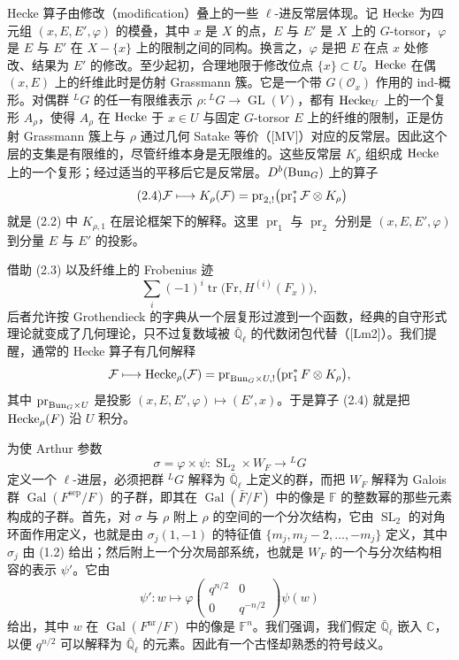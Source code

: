 Hecke 算子由修改（modification）叠上的一些 $\ell$-进反常层体现。记 $\mathrm{Hecke}$ 为四元组 $(x,E,E',\varphi)$ 的模叠，其中 $x$ 是 $X$ 的点，$E$ 与 $E'$ 是 $X$ 上的 $G$-torsor，$\varphi$ 是 $E$ 与 $E'$ 在 $X-\{x\}$ 上的限制之间的同构。换言之，$\varphi$ 是把 $E$ 在点 $x$ 处修改、结果为 $E'$ 的修改。至少起初，合理地限于修改位点 $\{x\}\subset U$。$\mathrm{Hecke}$ 在偶 $(x,E)$ 上的纤维此时是仿射 Grassmann 簇。它是一个带 $G(\mathcal O_x)$ 作用的 ind-概形。对偶群 ${}^LG$ 的任一有限维表示 $\rho:{}^LG\to\operatorname{GL}(V)$，都有 $\mathrm{Hecke}_U$ 上的一个复形 $A_\rho$，使得 $A_\rho$ 在 $\mathrm{Hecke}$ 于 $x\in U$ 与固定 $G$-torsor $E$ 上的纤维的限制，正是仿射 Grassmann 簇上与 $\rho$ 通过几何 Satake 等价（[MV]）对应的反常层。因此这个层的支集是有限维的，尽管纤维本身是无限维的。这些反常层 $K_\rho$ 组织成 $\mathrm{Hecke}$ 上的一个复形；经过适当的平移后它是反常层。$D^b(\mathrm{Bun}_G)$ 上的算子
\begin{equation}\tag{2.4}
\mathcal F\longmapsto K_\rho(\mathcal F)=\operatorname{pr}_{2,!}\bigl(\operatorname{pr}_1^*\mathcal F\otimes K_\rho\bigr)
\end{equation}
就是 (2.2) 中 $K_{\rho,1}$ 在层论框架下的解释。这里 $\operatorname{pr}_1$ 与 $\operatorname{pr}_2$ 分别是 $(x,E,E',\varphi)$ 到分量 $E$ 与 $E'$ 的投影。

借助 (2.3) 以及纤维上的 Frobenius 迹
\[
\sum_i(-1)^i\operatorname{tr}\bigl(\mathrm{Fr},H^{(i)}(F_x)\bigr),
\]
后者允许按 Grothendieck 的字典从一个层复形过渡到一个函数，经典的自守形式理论就变成了几何理论，只不过复数域被 $\bar{\mathbb Q}_\ell$ 的代数闭包代替（[Lm2]）。我们提醒，通常的 Hecke 算子有几何解释
\[
\mathcal F\longmapsto\mathrm{Hecke}_\rho(\mathcal F)
=\operatorname{pr}_{\mathrm{Bun}_G\times U,!}\bigl(\operatorname{pr}_1^*F\otimes K_\rho\bigr),
\]
其中 $\operatorname{pr}_{\mathrm{Bun}_G\times U}$ 是投影 $(x,E,E',\varphi)\mapsto(E',x)$。于是算子 (2.4) 就是把 $\mathrm{Hecke}_\rho(F)$ 沿 $U$ 积分。

为使 Arthur 参数
\begin{equation}\tag{2.5}
\sigma=\varphi\times\psi:\operatorname{SL}_2\times W_F\longrightarrow{}^LG
\end{equation}
定义一个 $\ell$-进层，必须把群 ${}^LG$ 解释为 $\bar{\mathbb Q}_\ell$ 上定义的群，而把 $W_F$ 解释为 Galois 群 $\operatorname{Gal}(F^{\mathrm{sep}}/F)$ 的子群，即其在 $\operatorname{Gal}(\bar F/F)$ 中的像是 $\mathbb F$ 的整数幂的那些元素构成的子群。首先，对 $\sigma$ 与 $\rho$ 附上 $\rho$ 的空间的一个分次结构，它由 $\operatorname{SL}_2$ 的对角环面作用定义，也就是由 $\sigma_j(1,-1)$ 的特征值 $\{m_j,m_j-2,\dots,-m_j\}$ 定义，其中 $\sigma_j$ 由 (1.2) 给出；然后附上一个分次局部系统，也就是 $W_F$ 的一个与分次结构相容的表示 $\psi'$。它由
\[
\psi':w\longmapsto\varphi
\begin{pmatrix}q^{n/2}&0\\0&q^{-n/2}\end{pmatrix}\psi(w)
\]
给出，其中 $w$ 在 $\operatorname{Gal}(F^{\mathrm{nr}}/F)$ 中的像是 $\mathbb F^n$。我们强调，我们假定 $\bar{\mathbb Q}_\ell$ 嵌入 $\mathbb C$，以便 $q^{n/2}$ 可以解释为 $\bar{\mathbb Q}_\ell$ 的元素。因此有一个古怪却熟悉的符号歧义。

